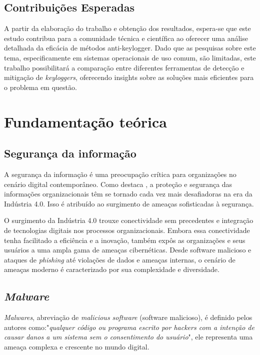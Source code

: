 \documentclass[12pt]{article}
\begin{document}
\subsection{Contribuições Esperadas}
A partir da elaboração do trabalho e obtenção dos resultados, espera-se que este estudo contribua para a comunidade técnica e científica ao oferecer uma análise detalhada da eficácia de métodos anti-keylogger. Dado que as pesquisas sobre este tema, especificamente em sistemas operacionais de uso comum, são limitadas, este trabalho possibilitará a comparação entre diferentes ferramentas de detecção e mitigação de \textit{keyloggers}, oferecendo insights sobre as soluções mais eficientes para o problema em questão.

\section{Fundamentação teórica}

\subsection{Segurança da informação}
A segurança da informação é uma preocupação crítica para organizações no cenário digital contemporâneo. Como destaca \citep{bhaharin2019issues} , a proteção e segurança das informações organizacionais têm se tornado cada vez mais desafiadoras na era da Indústria 4.0. Isso é atribuído ao surgimento de ameaças sofisticadas à segurança.

O surgimento da Indústria 4.0 trouxe conectividade sem precedentes e integração de tecnologias digitais nos processos organizacionais. Embora essa conectividade tenha facilitado a eficiência e a inovação, também expôs as organizações e seus usuários a uma ampla gama de ameaças cibernéticas. Desde software malicioso e ataques de \textit{phishing} até violações de dados e ameaças internas, o cenário de ameaças moderno é caracterizado por sua complexidade e diversidade.
\subsection{\textit{Malware}}
\textit{Malwares}, abreviação de \textit{malicious software} (software malicioso), é definido pelos autores \citep{singh2021keylogger} como:"\textit{qualquer código ou programa escrito por hackers com a intenção de causar danos a um sistema sem o consentimento do usuário}", ele representa uma ameaça complexa e crescente no mundo digital.
\end{document}
